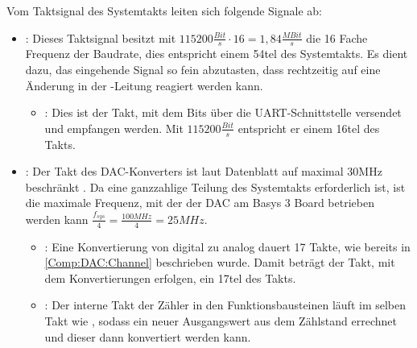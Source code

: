 Vom Taktsignal des Systemtakts  leiten sich folgende Signale ab:
\begin{itemize}
\item {}: Dieses Taktsignal besitzt mit $115200 \frac{Bit}{s} \cdot 16 = 1,84 \frac{MBit}{s}$ die 16 Fache Frequenz der Baudrate, dies entspricht einem 54tel des Systemtakts.
  Es dient dazu, das eingehende Signal so fein abzutasten, dass rechtzeitig auf eine Änderung in der -Leitung reagiert werden kann.
    \begin{itemize}
      \item {}: Dies ist der Takt, mit dem Bits über die UART-Schnittstelle versendet und empfangen werden.
      Mit $115200 \frac{Bit}{s}$ entspricht er einem 16tel des  Takts.
    \end{itemize}
  \item {}: Der Takt des DAC-Konverters ist laut Datenblatt auf maximal 30MHz beschränkt \cite{DAC121S101}.
    Da eine ganzzahlige Teilung des Systemtakts erforderlich ist, ist die maximale Frequenz, mit der der DAC am Basys 3 Board betrieben werden kann $\frac{f_{sys}}{4} = \frac{100MHz}{4} = 25MHz$.
    \begin{itemize}
    \item {}: Eine Konvertierung von digital zu analog dauert 17 Takte, wie bereits in \cref{Comp:DAC:Channel} beschrieben wurde.
      Damit beträgt der Takt, mit dem Konvertierungen erfolgen, ein 17tel des  Takts.
    \item {}: Der interne Takt der Zähler in den Funktionsbausteinen läuft im selben Takt wie , sodass ein neuer Ausgangswert aus dem Zählstand errechnet und dieser dann konvertiert werden kann.
    \end{itemize}
\end{itemize}

